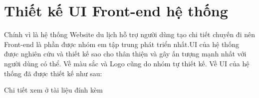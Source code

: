 \section{Thiết kế UI Front-end hệ thống}

     Chính vì là hệ thống Website du lịch hỗ trợ người dùng tạo chi tiết chuyến đi nên Front-end là phần được nhóm em tập trung phát triển nhất.UI của hệ thống được nghiên cứu và thiết kế sao cho thân thiện và gây ấn tượng mạnh nhất với người dùng có thể.
     Về màu sắc và Logo cũng do nhóm tự thiết kế. Về UI của hệ thống đã được thiết kế như sau: 
     
     Chi tiết xem ở tài liệu đính kèm
     
     








